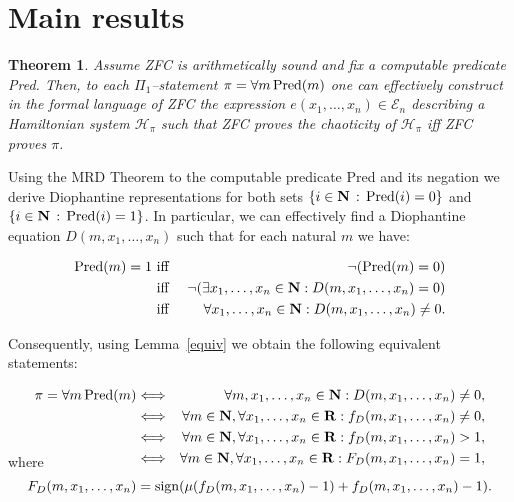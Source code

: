 \documentclass[
aip,
cha,
amssymb
]{revtex4-1}
\def \N{{\mathbf N}}
\def \R{{\mathbf R}}
\newtheorem{thm}{Theorem}
\newenvironment{proof}{\trivlist \item[\hskip \labelsep{\bf Proof.}]}%
{{\hfill$\Box$}\endtrivlist}
\begin{document}
\section{Main results}


\begin{thm} \label{CC}Assume {\rm ZFC} is arithmetically
sound and fix a computable predicate {\rm Pred}. Then, to each $\Pi_{1}$--statement
$\pi= \forall m \, {\rm Pred}(m)$
one can effectively construct in the formal language of {\rm ZFC} the expression $e(x_{1}, \ldots ,x_{n}) \in \mathcal{E}_{n}$ describing a  Hamiltonian system $\mathcal{H}_{\pi}$ such that  {\rm ZFC} proves the chaoticity of
$\mathcal{H}_{\pi}$  iff   {\rm ZFC} proves $\pi$.

\end{thm}


Using the MRD Theorem \cite{Matiyasevich-htp} to the  computable predicate Pred and its negation  we derive Diophantine representations for both
sets $\{i \in\N \,:\, {\rm Pred}(i) =0\}$ and $\{i \in\N \,:\,  {\rm Pred}(i) =1\}$. In particular, we can effectively find a Diophantine equation $D(m, x_{1}, \ldots ,x_{n})$ such that for each natural $m$ we have:



\begin{eqnarray*}
{\rm Pred}(m)=1 &\mbox{  iff  } & \neg( {\rm Pred}(m)=0)\\
&\mbox{  iff  } & \neg( \exists    x_{1}, \ldots ,x_{n}\in\N:
D(m, x_{1}, \ldots ,x_{n}) =0)\\
&\mbox{  iff  } & \forall   x_{1}, \ldots ,x_{n}\in \N:  D(m, x_{1}, \ldots ,x_{n}) \not=0.
\end{eqnarray*}



Consequently, using Lemma~\ref{equiv} we obtain the following equivalent statements:


\begin{eqnarray*}
 \pi=\forall m \, {\rm Pred}(m) &  \Longleftrightarrow & \forall m, x_{1}, \ldots ,x_{n} \in \N: D(m,x_{1}, \ldots ,x_{n})\not=0,\\
& \Longleftrightarrow  & \forall m\in\N, \forall  x_{1}, \ldots ,x_{n} \in\R:  f_{D}(m,x_{1}, \ldots ,x_{n})\not=0,\\
& \Longleftrightarrow  &
\forall m\in\N, \forall  x_{1}, \ldots ,x_{n} \in\R:  f_{D}(m,x_{1}, \ldots ,x_{n})>1,\\
& \Longleftrightarrow  &
\forall m\in\N, \forall  x_{1}, \ldots ,x_{n} \in\R:  F_{D}(m,x_{1}, \ldots ,x_{n})=1,\\[-4ex]
\end{eqnarray*}
where $$F_{D}(m,x_{1}, \ldots ,x_{n}) = {\rm sign}(\mu(f_{D}(m,x_{1}, \ldots ,x_{n})-1)+f_{D}(m,x_{1}, \ldots ,x_{n})-1).$$
\end{document}
